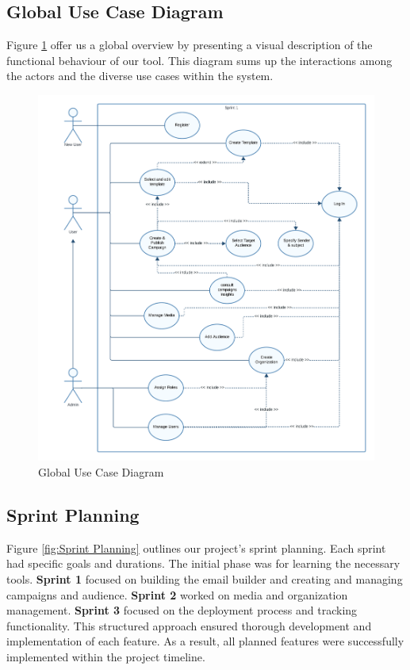 \clearpage
\subsection{Global Use Case Diagram}
Figure \ref{fig:Global Use Case Diagram} offer us a global overview by presenting a visual description of the functional
behaviour of our tool. This diagram sums up the interactions among the actors and the
diverse use cases within the system.

\begin{figure}[ht]
	\centering
	\includegraphics[width=\linewidth]{Images//images/global use case diag.png}
	\caption{Global Use Case Diagram}
	\label{fig:Global Use Case Diagram}
\end{figure}

\newpage

\subsection{Sprint Planning}

Figure \ref{fig:Sprint Planning} outlines our project's sprint planning. Each sprint had specific goals and durations. The initial phase was for learning the necessary tools. \textbf{Sprint 1} focused on building the email builder and creating and managing campaigns and audience. \textbf{Sprint 2} worked on media and organization management. \textbf{Sprint 3} focused on the deployment process and tracking functionality. This structured approach ensured thorough development and implementation of each feature. As a result, all planned features were successfully implemented within the project timeline.

